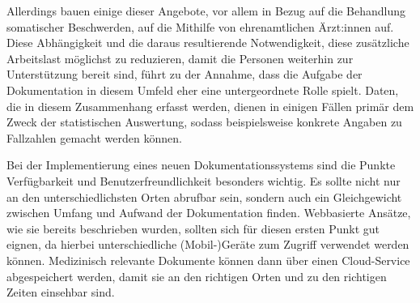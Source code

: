 Allerdings bauen einige dieser Angebote, vor allem in Bezug auf die Behandlung somatischer Beschwerden, auf die Mithilfe von ehrenamtlichen Ärzt:innen auf. Diese Abhängigkeit und die daraus resultierende Notwendigkeit, diese zusätzliche Arbeitslast möglichst zu reduzieren, damit die Personen weiterhin zur Unterstützung bereit sind, führt zu der Annahme, dass die Aufgabe der Dokumentation in diesem Umfeld eher eine untergeordnete Rolle spielt. Daten, die in diesem Zusammenhang erfasst werden, dienen in einigen Fällen primär dem Zweck der statistischen Auswertung, sodass beispielsweise konkrete Angaben zu Fallzahlen gemacht werden können.

Bei der Implementierung eines neuen Dokumentationssystems sind die Punkte Verfügbarkeit und Benutzerfreundlichkeit besonders wichtig. Es sollte nicht nur an den unterschiedlichsten Orten abrufbar sein, sondern auch ein Gleichgewicht zwischen Umfang und Aufwand der Dokumentation finden. Webbasierte Ansätze, wie sie bereits beschrieben wurden, sollten sich für diesen ersten Punkt gut eignen, da hierbei unterschiedliche (Mobil-)Geräte zum Zugriff verwendet werden können. Medizinisch relevante Dokumente können dann über einen Cloud-Service abgespeichert werden, damit sie an den richtigen Orten und zu den richtigen Zeiten einsehbar sind.